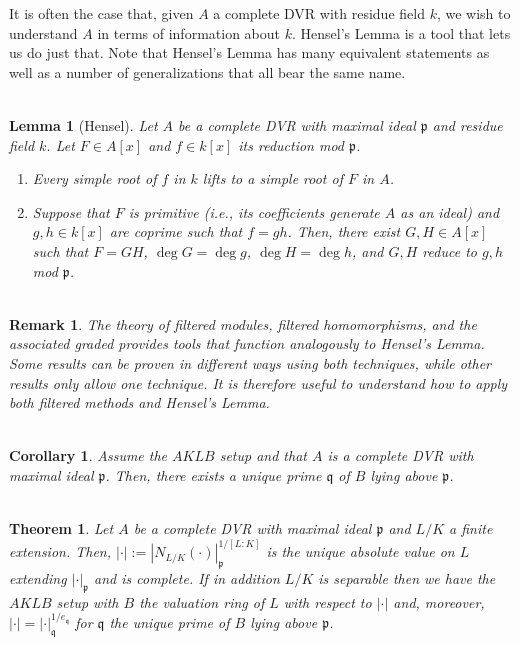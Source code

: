 \documentclass[11pt]{article}
\newcommand{\abs}[1]{\left\lvert#1\right\rvert}
\newcommand{\mf}[1]{\mathfrak{#1}}
\newenvironment{enum}[1]{
\begin{enumerate}[label=\textup{({#1*})}]
}
{
\end{enumerate}
}
\newtheorem*{corollary*}{\\Corollary}
\newtheorem*{lemma*}{\\Lemma}
\newtheorem*{remark*}{\\Remark}
\newtheorem*{theorem*}{\\Theorem}
\begin{document}
It is often the case that, given $A$ a complete DVR with residue field $k$, we wish to understand $A$ in terms of information about $k$. Hensel's Lemma is a tool that lets us do just that. Note that Hensel's Lemma has many equivalent statements as well as a number of generalizations that all bear the same name.

\begin{lemma*}[Hensel]
Let $A$ be a complete DVR with maximal ideal $\mf{p}$ and residue field $k$. Let $F\in A[x]$ and $f\in k[x]$ its reduction mod $\mf{p}$. 
\begin{enum}{\alph}
\item Every simple root of $f$ in $k$ lifts to a simple root of $F$ in $A$.
\item Suppose that $F$ is primitive (i.e., its coefficients generate $A$ as an ideal) and $g,h\in k[x]$ are coprime such that $f=gh$. Then, there exist $G,H\in A[x]$ such that $F=GH$, $\deg G=\deg g$, $\deg H=\deg h$, and $G,H$ reduce to $g,h$ mod $\mf{p}$. 
\end{enum}
\end{lemma*}

\begin{remark*}
The theory of filtered modules, filtered homomorphisms, and the associated graded provides tools that function analogously to Hensel's Lemma. Some results can be proven in different ways using both techniques, while other results only allow one technique. It is therefore useful to understand how to apply both filtered methods and Hensel's Lemma.
\end{remark*}

\begin{corollary*}
Assume the $AKLB$ setup and that $A$ is a complete DVR with maximal ideal $\mf{p}$. Then, there exists a unique prime $\mf{q}$ of $B$ lying above $\mf{p}$.
\end{corollary*}

\begin{theorem*}
Let $A$ be a complete DVR with maximal ideal $\mf{p}$ and $L/K$ a finite extension. Then, $\abs{\cdot}:=|N_{L/K}(\cdot)|_{\mf{p}}^{1/[L:K]}$ is the unique absolute value on $L$ extending $\abs{\cdot}_{\mf{p}}$ and is complete. If in addition $L/K$ is separable then we have the $AKLB$ setup with $B$ the valuation ring of $L$ with respect to $\abs{\cdot}$ and, moreover, $\abs{\cdot}=\abs{\cdot}_{\mf{q}}^{1/e_{\mf{q}}}$ for $\mf{q}$ the unique prime of $B$ lying above $\mf{p}$.
\end{theorem*}
\end{document}

